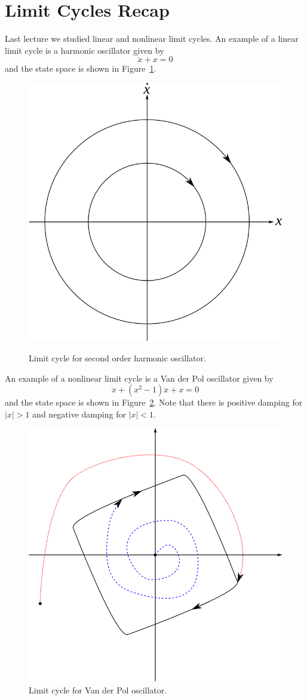 \mainmatter%
\setcounter{page}{1}

\lectureseries[\course]{\course}

\date{January 7, 2010}

\setaddress%

\setcounter{lecture}{1}
\setcounter{chapter}{1}

\label{lec:mae281a_lec02}

\section{Limit Cycles Recap}
Last lecture we studied linear and nonlinear limit cycles.
An example of a linear limit cycle is a  harmonic oscillator given by
$$\ddot{x} + x = 0$$
and the state space is shown in Figure~\ref{fig:02secondorder}.

\begin{figure}[ht!]
\centering
\includegraphics[width=.4\textwidth]{images/01secondorder}
\label{fig:02secondorder}
\caption{Limit cycle for second order harmonic oscillator.}
\end{figure}

An example of a nonlinear limit cycle is a Van der Pol oscillator given by
$$\ddot{x} + (x^2-1)\ddot{x} + x = 0$$
and the state space is shown in Figure~\ref{fig:02vdplc}.
Note that there is positive damping for $|x|>1$ and negative damping for $|x|<1$.

\begin{figure}[ht!]
\centering
\includegraphics[width=.4\textwidth]{images/02vdplc}
\caption{Limit cycle for Van der Pol oscillator.}
\label{fig:02vdplc}
\end{figure}

